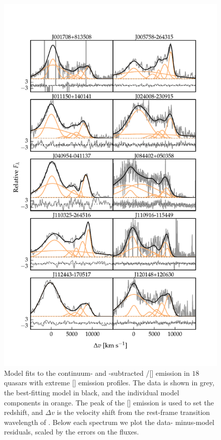 \begin{figure}
    \centering
    \includegraphics[width=\columnwidth]{figures/chapter04/example_spectrum_grid_extreme_oiii_1.pdf} 
    \caption[{Model fits to the \hbns/[] emission in $18$ quasars with extreme [] emission profiles.}]{Model fits to the continuum- and -subtracted \hbns/[] emission in $18$ quasars with extreme [] emission profiles. The data is shown in grey, the best-fitting model in black, and the individual model components in orange. The peak of the [] emission is used to set the redshift, and $\Delta{v}$ is the velocity shift from the rest-frame transition wavelength of \hbns. Below each spectrum we plot the data- minus-model residuals, scaled by the errors on the fluxes.}     
    \label{fig:example_spectrum_grid_extreme_oiii}
\end{figure}

